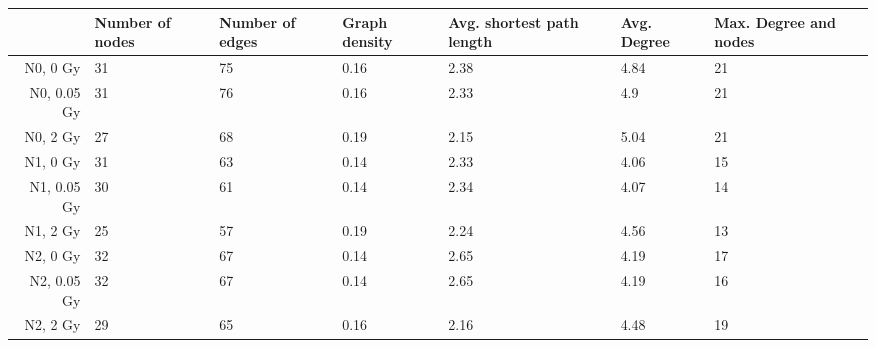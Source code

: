 \begin{table}[ht]
\centering
\begin{tabular}{rllllll}
  \toprule
 & Number of nodes & Number of edges & Graph density & Avg. shortest path length & Avg. Degree & Max. Degree and nodes \\ 
  \midrule
N0, 0 Gy & 31 & 75 & 0.16 & 2.38 & 4.84 & 21 \\ 
  N0, 0.05 Gy & 31 & 76 & 0.16 & 2.33 & 4.9 & 21 \\ 
  N0, 2 Gy & 27 & 68 & 0.19 & 2.15 & 5.04 & 21 \\ 
  N1, 0 Gy & 31 & 63 & 0.14 & 2.33 & 4.06 & 15 \\ 
  N1, 0.05 Gy & 30 & 61 & 0.14 & 2.34 & 4.07 & 14 \\ 
  N1, 2 Gy & 25 & 57 & 0.19 & 2.24 & 4.56 & 13 \\ 
  N2, 0 Gy & 32 & 67 & 0.14 & 2.65 & 4.19 & 17 \\ 
  N2, 0.05 Gy & 32 & 67 & 0.14 & 2.65 & 4.19 & 16 \\ 
  N2, 2 Gy & 29 & 65 & 0.16 & 2.16 & 4.48 & 19 \\ 
   \bottomrule
\end{tabular}
\end{table}
